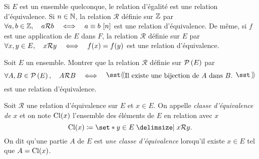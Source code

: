 \documentclass{magnolia}
\begin{document}
\begin{remarqueUnique}
\remarque Si $E$ est un ensemble quelconque, le relation d'égalité est une
  relation d'équivalence. Si $n\in\mathbb{N}$, la relation $\mathcal{R}$ définie sur $\mathbb{Z}$ par
  \og $\forall a,b\in\mathbb{Z} ,\quad a\mathcal{R} b \quad\Longleftrightarrow\quad a\equiv b\ [n]$ \fg
  est une relation d'équivalence. De même, si $f$ est une application
  de $E$ dans $F$, la relation $\mathcal{R}$ définie sur $E$ par
  \og $\forall x,y\in E ,\quad x\mathcal{R}y \quad\Longleftrightarrow\quad f(x)=f(y)$ \fg
  est une relation d'équivalence.
\end{remarqueUnique}

\begin{exoUnique}
\exo Soit $E$ un ensemble. Montrer que la relation $\mathcal{R}$ définie
  sur $\mathcal{P}\left(E\right)$ par
  \[\forall A,B\in\parties{E} \qsep A\mathcal{R} B \quad\ssi\quad
    \text{\og Il existe une bijection de $A$ dans $B$. \fg}\]
  est une relation d'équivalence.
\end{exoUnique}


\begin{definition}[utile=-3]
Soit $\mathcal{R}$ une relation d'équivalence sur $E$ et $x\in E$. On appelle
\emph{classe d'équivalence de $x$} et on note ${\rm Cl}(x)$ l'ensemble des
éléments de $E$ en relation avec $x$
\[{\rm Cl}(x)\defeq\enstq{y\in E}{x\mathcal{R}y}.\]
On dit qu'une partie $A$ de $E$ est \emph{une classe d'équivalence} lorsqu'il existe
$x\in E$ tel que $A={\rm Cl}(x)$.
\end{definition}

\end{document}
